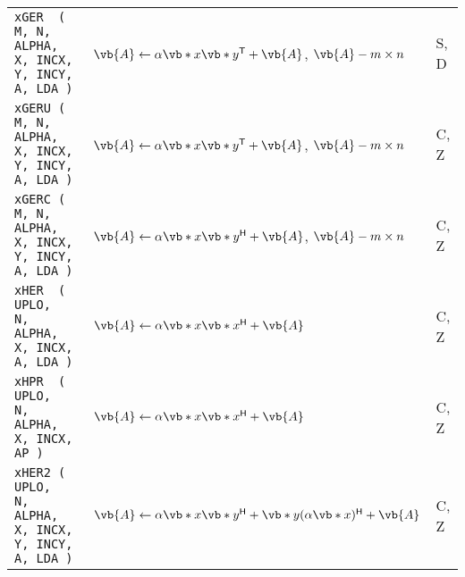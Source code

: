 \documentclass[10pt,a3paper, landscape]{article}
\newcommand{\T}{\mathsf{T}}
\renewcommand{\H}{\mathsf{H}}
\begin{document}
\begin{tabular}{lll}
		\verb|xGER  (                    M, N, ALPHA, X, INCX, Y, INCY, A, LDA )                       |                                                                    & $\vb{A} \gets \alpha \vb*{x}\vb*{y}^{\T} + \vb{A}$, $\vb{A} - m \times n$                                                                                                                                                                                    & S, D               \\
		\verb|xGERU (                    M, N, ALPHA, X, INCX, Y, INCY, A, LDA )                       |                                                                    & $\vb{A} \gets \alpha \vb*{x}\vb*{y}^{\T} + \vb{A}$, $\vb{A} - m \times n$                                                                                                                                                                                    & C, Z               \\
		\verb|xGERC (                    M, N, ALPHA, X, INCX, Y, INCY, A, LDA )                       |                                                                    & $\vb{A} \gets \alpha \vb*{x}\vb*{y}^{\H} + \vb{A}$, $\vb{A} - m \times n$                                                                                                                                                                                    & C, Z               \\
		\verb|xHER  ( UPLO,                 N, ALPHA, X, INCX,          A, LDA )                       |                                                                    & $\vb{A} \gets \alpha \vb*{x}\vb*{x}^{\H} + \vb{A}$                                                                                                                                                                                                           & C, Z               \\
		\verb|xHPR  ( UPLO,                 N, ALPHA, X, INCX,          AP )                           |                                                                    & $\vb{A} \gets \alpha \vb*{x}\vb*{x}^{\H} + \vb{A}$                                                                                                                                                                                                           & C, Z               \\
		\verb|xHER2 ( UPLO,                 N, ALPHA, X, INCX, Y, INCY, A, LDA )                       |                                                                    & $\vb{A} \gets \alpha \vb*{x}\vb*{y}^{\H} + \vb*{y}(\alpha \vb*{x})^{\H} + \vb{A}$                                                                                                                                                                            & C, Z               \\

\end{tabular}
\end{document}
